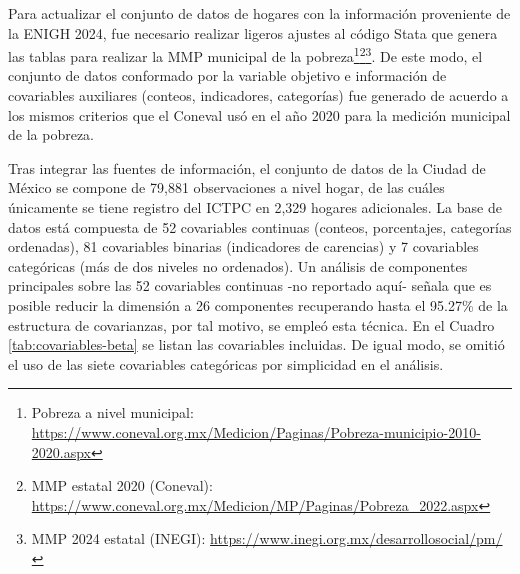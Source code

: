 \documentclass[11pt]{article}
\begin{document}
Para actualizar el conjunto de datos de hogares con la información proveniente de la ENIGH 2024, fue necesario realizar ligeros ajustes al código Stata que genera las tablas
para realizar la MMP municipal de la pobreza\footnote{Pobreza a nivel municipal: \url{https://www.coneval.org.mx/Medicion/Paginas/Pobreza-municipio-2010-2020.aspx}}\footnote{MMP estatal 2020 (Coneval): \url{https://www.coneval.org.mx/Medicion/MP/Paginas/Pobreza_2022.aspx}}\footnote{MMP 2024 estatal (INEGI): \url{https://www.inegi.org.mx/desarrollosocial/pm/}}. De este modo, el conjunto de datos conformado por la variable objetivo e información de covariables auxiliares (conteos, indicadores, categorías) fue generado de acuerdo a los mismos criterios que el Coneval usó en el año 2020 para la medición municipal de la pobreza. 

Tras integrar las fuentes de información, el conjunto de datos de la Ciudad de México se compone de 79,881 observaciones a nivel hogar, de las cuáles únicamente se tiene registro del ICTPC en 2,329 hogares adicionales. La base de datos está compuesta de 52 covariables continuas (conteos, porcentajes, categorías ordenadas), 81 covariables binarias (indicadores de carencias) y 7 covariables categóricas (más de dos niveles no ordenados).
Un análisis de componentes principales sobre las 52 covariables continuas -no reportado aquí- señala que es posible reducir la dimensión a 26 componentes recuperando hasta el 95.27\% de la estructura de covarianzas, por tal motivo, se empleó esta técnica. En el Cuadro \ref{tab:covariables-beta} se listan las covariables incluidas. De igual modo, se omitió el uso de las siete covariables categóricas por simplicidad en el análisis.
\end{document}

